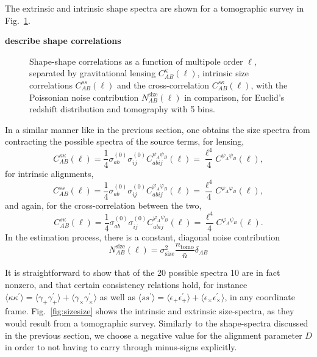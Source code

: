 \documentclass[a4paper,fleqn,usenatbib]{mnras}
\def\spirou#1{{\bf #1}}
\newcommand{\bra}{\langle}
\newcommand{\ket}{\rangle}
\begin{document}
The extrinsic and intrinsic shape spectra are shown for a tomographic survey in Fig.~\ref{fig:shapeshape}.

\spirou{describe shape correlations}


\begin{figure}
\centering
\caption{Shape-shape correlations as a function of multipole order $\ell$, separated by gravitational lensing $C_{AB}^{\kappa}(\ell)$, intrinsic size correlations $C_{AB}^{ss}(\ell)$ and the cross-correlation $C_{AB}^{s\kappa}(\ell)$, with the Poissonian noise contribution $N_{AB}^\mathrm{size}(\ell)$ in comparison, for Euclid's redshift distribution and tomography with 5 bins.}
\label{fig:shapeshape}
\end{figure}

In a similar manner like in the previous section, one obtains the size spectra from contracting the possible spectra of the source terms, for lensing,
\begin{equation}
C^{\kappa\kappa}_{AB}(\ell) = \frac{1}{4}\sigma^{(0)}_{ab}\sigma^{(0)}_{ij}C^{\psi_A\psi_B}_{abij}(\ell) = \frac{\ell^4}{4}C^{\psi_A\psi_B}(\ell),
\end{equation}
for intrinsic alignments,
\begin{equation}
C^{ss}_{AB}(\ell) = \frac{1}{4}\sigma^{(0)}_{ab}\sigma^{(0)}_{ij}C^{\varphi_A\varphi_B}_{abij}(\ell) = \frac{\ell^4}{4}C^{\varphi_A\varphi_B}(\ell),
\end{equation}
and again, for the cross-correlation between the two,
\begin{equation}
C^{s\kappa}_{AB}(\ell) = \frac{1}{4}\sigma^{(0)}_{ab}\sigma^{(0)}_{ij}C^{\varphi_A\psi_B}_{abij}(\ell) = \frac{\ell^4}{4}C^{\varphi_A\psi_B}(\ell).
\end{equation}
In the estimation process, there is a constant, diagonal noise contribution
\begin{equation}
N_{AB}^\mathrm{size}(\ell) = \sigma^2_\mathrm{size} \frac{n_\mathrm{tomo}}{\bar{n}}\delta_{AB}
\end{equation}

It is straightforward to show that of the 20 possible spectra 10 are in fact nonzero, and that certain consistency relations hold, for instance $\bra\kappa\kappa^\prime\ket = \bra\gamma_+\gamma_+^\prime\ket + \bra\gamma_\times\gamma_\times^\prime\ket$ as well as $\bra ss^\prime\ket = \bra\epsilon_+\epsilon_+^\prime\ket + \bra\epsilon_\times\epsilon_\times^\prime\ket$, in any coordinate frame. Fig.~\ref{fig:sizesize} shows the intrinsic and extrinsic size-spectra, as they would result from a tomographic survey. Similarly to the shape-spectra discussed in the previous section, we choose a negative value for the alignment parameter $D$ in order to not having to carry through minus-signs explicitly.
\end{document}
